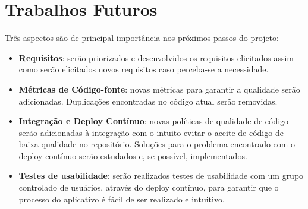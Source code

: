 \section{Trabalhos Futuros}

Três aspectos são de principal importância nos próximos passos do projeto:

\begin{itemize}
    \item \textbf{Requisitos}: serão priorizados e desenvolvidos os requisitos elicitados assim como serão elicitados novos requisitos caso perceba-se a necessidade.
    \item \textbf{Métricas de Código-fonte}: novas métricas para garantir a qualidade serão adicionadas. Duplicações encontradas no código atual serão removidas.
    \item \textbf{Integração e Deploy Contínuo}: novas políticas de qualidade de código serão adicionadas à integração com o intuito evitar o aceite de código de baixa qualidade no repositório. Soluções para o problema encontrado com o deploy contínuo serão estudados e, se possível, implementados.
    \item \textbf{Testes de usabilidade}: serão realizados testes de usabilidade com um grupo controlado de usuários, através do deploy contínuo, para garantir que o processo do aplicativo é fácil de ser realizado e intuitivo.
\end{itemize}
